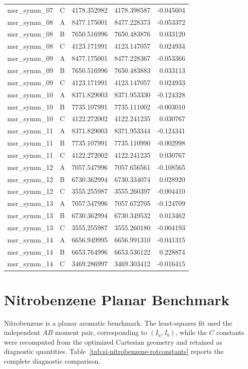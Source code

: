 \documentclass[12pt]{article}
\begin{document}
\begin{longtable}{llrrr}
msr\_symm\_07 & C & 4178.352982 & 4178.398587 & -0.045604 \\
msr\_symm\_08 & A & 8477.175001 & 8477.228373 & -0.053372 \\
msr\_symm\_08 & B & 7650.516996 & 7650.483876 & 0.033120 \\
msr\_symm\_08 & C & 4123.171991 & 4123.147057 & 0.024934 \\
msr\_symm\_09 & A & 8477.175001 & 8477.228367 & -0.053366 \\
msr\_symm\_09 & B & 7650.516996 & 7650.483883 & 0.033113 \\
msr\_symm\_09 & C & 4123.171991 & 4123.147057 & 0.024933 \\
msr\_symm\_10 & A & 8371.829003 & 8371.953330 & -0.124328 \\
msr\_symm\_10 & B & 7735.107991 & 7735.111002 & -0.003010 \\
msr\_symm\_10 & C & 4122.272002 & 4122.241235 & 0.030767 \\
msr\_symm\_11 & A & 8371.829003 & 8371.953344 & -0.124341 \\
msr\_symm\_11 & B & 7735.107991 & 7735.110990 & -0.002998 \\
msr\_symm\_11 & C & 4122.272002 & 4122.241235 & 0.030767 \\
msr\_symm\_12 & A & 7057.547996 & 7057.656561 & -0.108565 \\
msr\_symm\_12 & B & 6730.362994 & 6730.334074 & 0.028920 \\
msr\_symm\_12 & C & 3555.255987 & 3555.260397 & -0.004410 \\
msr\_symm\_13 & A & 7057.547996 & 7057.672705 & -0.124709 \\
msr\_symm\_13 & B & 6730.362994 & 6730.349532 & 0.013462 \\
msr\_symm\_13 & C & 3555.255987 & 3555.260180 & -0.004193 \\
msr\_symm\_14 & A & 6656.949995 & 6656.991310 & -0.041315 \\
msr\_symm\_14 & B & 6653.764996 & 6653.536122 & 0.228874 \\
msr\_symm\_14 & C & 3469.286997 & 3469.303412 & -0.016415 \\
\bottomrule
\end{longtable}

\section{Nitrobenzene Planar Benchmark}

Nitrobenzene is a planar aromatic benchmark. The least-squares fit used the
independent $AB$ moment pair, corresponding to $(I_a,I_b)$, while the $C$
constants were recomputed from the optimized Cartesian geometry and retained as
diagnostic quantities. Table~\ref{tab:si-nitrobenzene-rotconstants} reports the
complete diagnostic comparison.
\end{document}
